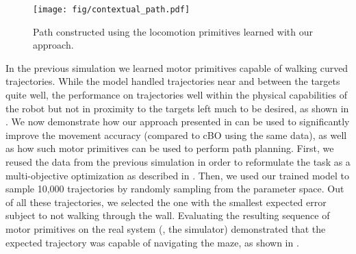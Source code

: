 	\begin{wrapfigure}{r}{0.50\linewidth} 
	\vspace{-10pt}
	  \centering
	  \texttt{[image: fig/contextual\_path.pdf]}
	  \caption{Path constructed using the locomotion primitives learned with our approach.}
	  \label{fig:pathing2}
	   \vspace{-8pt}
	\end{wrapfigure}
	In the previous simulation we learned motor primitives capable of walking curved trajectories.
    While the model handled trajectories near and between the targets quite well, the performance on trajectories well within the physical capabilities of the robot but not in proximity to the targets left much to be desired, as shown in .
	We now demonstrate how our approach presented in  can be used to significantly improve the movement accuracy (compared to cBO using the same data), as well as how such motor primitives can be used to perform path planning.
    First, we reused the data from the previous simulation in order to reformulate the task as a multi-objective optimization as described in .
    Then, we used our trained model to sample 10,000 trajectories by randomly sampling from the parameter space.
    Out of all these trajectories, we selected the one with the smallest expected error subject to not walking through the wall.
    Evaluating the resulting sequence of motor primitives on the real system (\ie, the simulator) demonstrated that the expected trajectory was capable of navigating the maze, as shown in .



    
    
    

